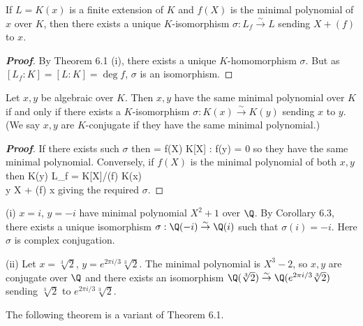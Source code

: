 \begin{corollary}
If $L = K(x)$ is a finite extension of $K$ and $f(X)$ is the minimal polynomial of $x$ over $K$, then there exists a unique $K$-isomorphism $\sigma : L_f
\stackrel{\sim}{\to} L$ sending $X+(f)$ to $x$.
\end{corollary}

\begin{proof}[\bf Proof]
By Theorem 6.1 (i), there exists a unique $K$-homomorphism $\sigma$. But as $[L_f : K] = [L : K] = \deg f$, $\sigma$ is an isomorphism.
\end{proof}

\begin{corollary}
Let $x, y$ be algebraic over $K$. Then $x, y$ have the same minimal polynomial over $K$ if and only if there exists a $K$-isomorphism $\sigma : K(x) \stackrel{\sim}{\to} K(y)$ sending $x$ to $y$. (We say $x, y$ are $K$-conjugate if they have the same minimal polynomial.)
\end{corollary}

\begin{proof}[\bf Proof]
If there exists such $\sigma$ then
\be
{} = {f(X) \in K[X] : f(y) = 0}
\ee
so they have the same minimal polynomial. Conversely, if $f(X)$ is the minimal polynomial of both $x, y$ then
\be
{}
K(y) \stackrel{\sim}{\longleftarrow} L_f = K[X]/(f) \stackrel{\sim}{\longrightarrow} K(x)\qquad\qquad \\
y  X + (f) \longmapsto x
\ea
\ee
giving the required $\sigma$.
\end{proof}




\begin{example}
\ben
\item [(i)] $x = i$, $y = -i$ have minimal polynomial $X^2 + 1$ over $\Q$. By Corollary 6.3, there exists a unique isomorphism $\sigma : \Q(-i) \stackrel{\sim}{\to} \Q(i)$ such that $\sigma(i) = -i$. Here $\sigma$ is complex conjugation.
\item [(ii)] Let $x = \sqrt[3]{2}$, $y = e^{2\pi i/3} \sqrt[3]{2}$. The minimal polynomial is $X^3 - 2$, so $x, y$ are conjugate over $\Q$ and there exists an isomorphism $\Q( \sqrt[3]{2}) \stackrel{\sim}{\to} \Q(e^{2\pi i/3}\sqrt[3]{2})$ sending $\sqrt[3]{2}$ to $e^{2\pi i/3} \sqrt[3]{2}$.
\een
\end{example}

The following theorem is a variant of Theorem 6.1.


